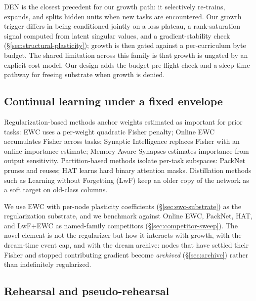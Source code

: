 \documentclass[11pt]{article}
\begin{document}
DEN \citep{yoon2018den} is the closest precedent for our growth path: it
selectively re-trains, expands, and splits hidden units when new tasks
are encountered. Our growth trigger differs in being conditioned jointly
on a loss plateau, a rank-saturation signal computed from latent
singular values, and a gradient-stability check
(\S\ref{sec:structural-plasticity}); growth is then gated against a
per-curriculum byte budget. The shared limitation across this family is
that growth is ungated by an explicit cost model. Our design adds the
budget pre-flight check and a sleep-time pathway for freeing substrate
when growth is denied.

\subsection{Continual learning under a fixed envelope}
\label{sec:rel-cl}

Regularization-based methods anchor weights estimated as important for
prior tasks: EWC \citep{kirkpatrick2017overcoming} uses a per-weight
quadratic Fisher penalty; Online EWC \citep{schwarz2018progress}
accumulates Fisher across tasks; Synaptic Intelligence
\citep{zenke2017si} replaces Fisher with an online importance estimate;
Memory Aware Synapses \citep{aljundi2018mas} estimates importance from
output sensitivity. Partition-based methods isolate per-task subspaces:
PackNet \citep{mallya2018packnet} prunes and reuses; HAT
\citep{serra2018hat} learns hard binary attention masks. Distillation
methods such as Learning without Forgetting (LwF) \citep{li2018lwf}
keep an older copy of the network as a soft target on old-class
columns.

We use EWC with per-node plasticity coefficients
(\S\ref{sec:ewc-substrate}) as the regularization substrate, and we
benchmark against Online EWC, PackNet, HAT, and LwF$+$EWC as
named-family competitors (\S\ref{sec:competitor-sweep}). The novel
element is not the regularizer but how it interacts with growth, with
the dream-time event cap, and with the dream archive: nodes that have
settled their Fisher and stopped contributing gradient become
\emph{archived} (\S\ref{sec:archive}) rather than indefinitely
regularized.

\subsection{Rehearsal and pseudo-rehearsal}
\label{sec:rel-rehearsal}
\end{document}
